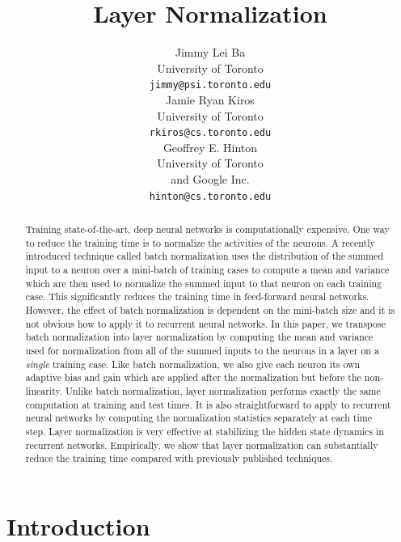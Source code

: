 \documentclass{article}
\title{Layer Normalization}
\author{
Jimmy Lei Ba \\
University of Toronto \\
{\small \texttt{jimmy@psi.toronto.edu}} \\
\And
Jamie Ryan Kiros \\
University of Toronto \\
{\small \texttt{rkiros@cs.toronto.edu}} \\
\And
Geoffrey E. Hinton \\
University of Toronto \\
and Google Inc.\\
{\small \texttt{hinton@cs.toronto.edu} }
}
\begin{document}
\maketitle

\begin{abstract}

Training state-of-the-art, deep neural networks is computationally expensive. One way to reduce the training time is to normalize the activities of the neurons.  A recently introduced technique called batch normalization uses the distribution of the summed input to a neuron over a mini-batch of training cases to compute a mean and variance which are then used to normalize the summed input to that neuron on each training case.  This significantly reduces the training time in feed-forward neural networks. However, the effect of batch normalization is dependent on the mini-batch size and it is not obvious how to apply it to recurrent neural networks.  In this paper, we transpose batch normalization into layer normalization by computing the mean and variance used for normalization from all of the summed inputs to the neurons in a layer on a {\it single} training case.  Like batch normalization, we also give each neuron its own adaptive bias and gain which are applied after the normalization but before the non-linearity.  Unlike batch normalization,  layer normalization performs exactly the same computation at training and test times.  It is also straightforward to apply to recurrent neural networks by computing the normalization statistics separately at each time step.  Layer normalization is very effective at stabilizing the hidden state dynamics in recurrent networks. Empirically, we show that layer normalization can substantially reduce the training time compared with previously published techniques.    

\end{abstract}

\section{Introduction}
\label{sec:intro}
\end{document}
